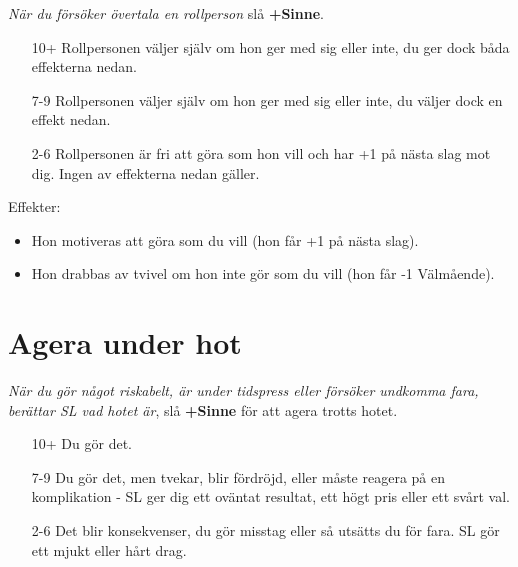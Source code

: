 \textit{När du försöker övertala en rollperson} slå \textbf{+Sinne}.
\begin{itemize}
  \item[10+] Rollpersonen väljer själv om hon ger med sig eller inte, du ger dock båda effekterna nedan.
  \item[7-9] Rollpersonen väljer själv om hon ger med sig eller inte, du väljer dock en effekt nedan.
  \item[2-6] Rollpersonen är fri att göra som hon vill och har +1 på nästa slag mot dig. Ingen av effekterna nedan gäller.
\end{itemize}
Effekter:
\begin{itemize}
  \item Hon motiveras att göra som du vill (hon får +1 på nästa slag).
  \item Hon drabbas av tvivel om hon inte gör som du vill (hon får -1 Välmående).
\end{itemize}
\section{Agera under hot}
\textit{När du gör något riskabelt, är under tidspress eller försöker undkomma fara, berättar SL vad hotet är}, slå \textbf{+Sinne} för att agera trotts hotet.
\begin{itemize}
  \item[10+] Du gör det.
  \item[7-9] Du gör det, men tvekar, blir fördröjd, eller måste reagera på en komplikation - SL ger dig ett oväntat resultat, ett högt pris eller ett svårt val.
  \item[2-6] Det blir konsekvenser, du gör misstag eller så utsätts du för fara. SL gör ett mjukt eller hårt drag.
\end{itemize}
